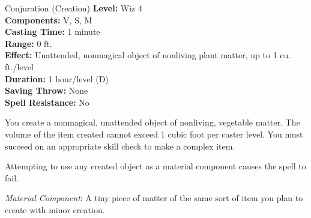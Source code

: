 {Conjuration (Creation)}
{
	\textbf{Level:}
	Wiz 4\\
	\textbf{Components:}
	V, S, M\\
	\textbf{Casting Time:}
	1 minute\\
	\textbf{Range:}
	0 ft.\\
	\textbf{Effect:}
	Unattended, nonmagical object of nonliving plant matter, up to 1 cu. ft./level\\
	\textbf{Duration:}
	1 hour/level (D)\\
	\textbf{Saving Throw:}
	None\\
	\textbf{Spell Resistance:}
	No\\
}
{
	You create a nonmagical, unattended object of nonliving, vegetable matter. The volume of the item created cannot exceed 1 cubic foot per caster level. You must succeed on an appropriate skill check to make a complex item.

	Attempting to use any created object as a material component causes the spell to fail.

	\textit{Material Component}:
	A tiny piece of matter of the same sort of item you plan to create with minor creation.

}
